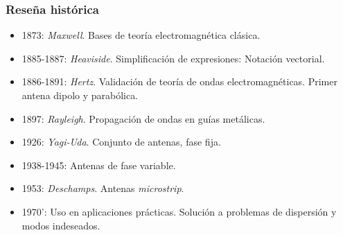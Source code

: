 \documentclass{beamer}
\begin{document}
		\begin{frame}
		\frametitle{Reseña histórica}
		\begin{itemize}
			\item 1873: \textit{Maxwell}. Bases de teoría electromagnética clásica.\\
			\item 1885-1887: \textit{Heaviside}. Simplificación de expresiones: Notación vectorial. \\
			\item 1886-1891: \textit{Hertz}. Validación de teoría de ondas electromagnéticas. Primer antena dipolo y parabólica.
			\item 1897: \textit{Rayleigh}. Propagación de ondas en guías metálicas.
			\item 1926: \textit{Yagi-Uda}. Conjunto de antenas, fase fija.
			\item 1938-1945: Antenas de fase variable.
			\item 1953: \textit{Deschamps}. Antenas \textit{microstrip}.
			\item 1970': Uso en aplicaciones prácticas. Solución a problemas de dispersión y modos indeseados.
		\end{itemize}
		\end{frame}
	
\end{document}
